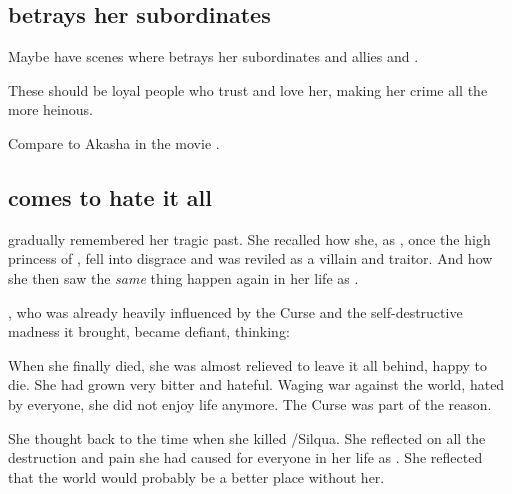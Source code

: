 \subsection{\Belzir{} betrays her subordinates}
Maybe have scenes where \Belzir{} betrays her subordinates and allies and . 

These should be loyal people who trust and love her, making her crime all the more heinous. 

Compare to Akasha in the movie \cite{Movie:QueenoftheDamned}.









\subsection{\Belzir{} comes to hate it all}
\Belzir{} gradually remembered her tragic past. 
She recalled how she, as \Shiaraid, once the high princess of \Mystraacht, fell into disgrace and was reviled as a villain and traitor. 
And how she then saw the \emph{same} thing happen again in her life as \Delphine. 

\Belzir, who was already heavily influenced by the Curse and the self-destructive madness it brought, became defiant, thinking: 

When she finally died, she was almost relieved to leave it all behind, happy to die. 
She had grown very bitter and hateful. 
Waging war against the world, hated by everyone, she did not enjoy life anymore. 
The Curse was part of the reason. 

She thought back to the time when she killed \Eryal/Silqua. 
She reflected on all the destruction and pain she had caused for everyone in her life as \Belzir. 
She reflected that the world would probably be a better place without her. 


